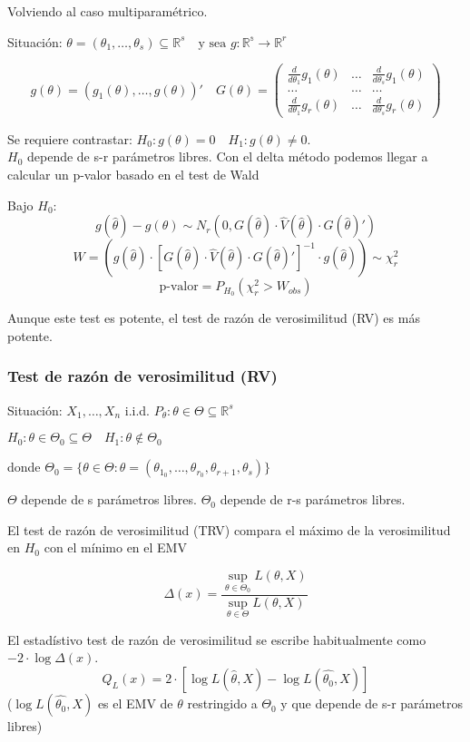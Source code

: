 Volviendo al caso multiparamétrico.

Situación: $\theta=(\theta_1,\dots,\theta_s) \subseteq \mathbb{R}^s \quad \text{y sea }g:\mathbb{R^s}\to \mathbb{R}^r$

\[
g(\theta)=(g_1(\theta),\dots,g(\theta))'
\quad G(\theta)=
\begin{pmatrix}
    \frac{d}{d \theta_1} g_1(\theta) & \dots &  \frac{d}{d \theta_s} g_1(\theta) \\
    \dots & \dots & \dots \\
    \frac{d}{d \theta_1} g_r(\theta) & \dots &  \frac{d}{d \theta_s} g_r(\theta)
\end{pmatrix}
\]

Se requiere contrastar: $H_0:g(\theta)=0 \quad H_1:g(\theta) \neq 0$.
\\ $H_0$ depende de s-r parámetros libres. Con el delta método podemos llegar a calcular un p-valor basado en el test de Wald

Bajo $H_0$:
\[
g(\widehat{\theta})-g(\theta) \sim N_r(0,G(\widehat{\theta})\cdot \widehat{V}(\widehat{\theta})\cdot G(\widehat{\theta})')
\]
\[
W=(g(\widehat{\theta})\cdot [G(\widehat{\theta})\cdot \widehat{V}(\widehat{\theta})\cdot G(\widehat{\theta})']^{-1} \cdot g(\widehat{\theta})) \sim \chi^2_r
\]
\[
\text{p-valor}=P_{H_0}(\chi^2_r>W_{obs})
\]

Aunque este test es potente, el test de razón de verosimilitud (RV) es más potente.

\subsubsection{Test de razón de verosimilitud (RV)}

Situación: $X_1,\dots,X_n$ i.i.d. $P_\theta:\theta \in \Theta \subseteq \mathbb{R}^s$

\(
H_0: \theta \in \Theta_0 \subseteq \Theta \quad H_1: \theta \notin \Theta_0
\)

donde $\Theta_0=\{
    \theta \in \Theta: \theta=(\theta_{1_0},\dots,\theta_{r_0},\theta_{r+1},\theta_s)
\}$

$\Theta$ depende de s parámetros libres. $\Theta_0$ depende de r-s parámetros libres.

El test de razón de verosimilitud (TRV) compara el máximo de la verosimilitud en $H_0$ con el mínimo en el EMV

\[
\Delta(x)=\frac{\sup_{\theta \in \Theta_0} L(\theta,X)}{\sup_{\theta \in \Theta} L(\theta,X)}
\]

El estadístivo test de razón de verosimilitud se escribe habitualmente como $-2 \cdot \log \Delta(x)$.
\[
Q_L(x)=2 \cdot [\log L(\widehat{\theta},X)-\log L(\widehat{\theta_0},X)]
\]
($\log L(\widehat{\theta_0},X)$ es el EMV de $\theta$ restringido a $\Theta_0$ y que depende de s-r parámetros libres)

